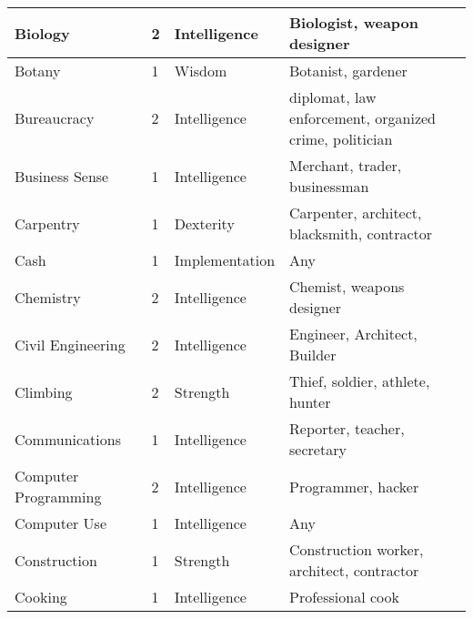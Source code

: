 \documentclass[twoside]{book}
\begin{document}
\begin{longtable}{p{1.25in}llp{12em}}
  \raggedright
           Biology 
  &
   2 
  &
   Intelligence 
  &
   Biologist, weapon
           designer 
  \tabularnewline
  \hline
      
  \raggedright
           Botany 
  &
   1 
  &
   Wisdom 
  &
   Botanist, gardener
           
  \tabularnewline
  \hline
      
  \raggedright
           Bureaucracy 
  &
   2 
  &
   Intelligence 
  &
   diplomat, law
           enforcement, organized crime, politician 
  \tabularnewline
  \hline
      
  \raggedright
           Business Sense 
  &
   1 
  &
   Intelligence 
  &
   Merchant, trader,
           businessman 
  \tabularnewline
  \hline
      
  \raggedright
           Carpentry 
  &
   1 
  &
   Dexterity 
  &
   Carpenter, architect,
           blacksmith, contractor 
  \tabularnewline
  \hline
      
  \raggedright
           Cash 
  &
   1 
  &
   Implementation 
  &
   Any 
  \tabularnewline
  \hline
      
  \raggedright
           Chemistry 
  &
   2 
  &
   Intelligence 
  &
   Chemist, weapons designer
           
  \tabularnewline
  \hline
      
  \raggedright
           Civil Engineering 
  &
   2 
  &
   Intelligence 
  &
   Engineer, Architect,
           Builder 
  \tabularnewline
  \hline
      
  \raggedright
           Climbing 
  &
   2 
  &
   Strength 
  &
   Thief, soldier, athlete,
           hunter 
  \tabularnewline
  \hline
      
  \raggedright
           Communications 
  &
   1 
  &
   Intelligence 
  &
   Reporter, teacher,
           secretary 
  \tabularnewline
  \hline
      
  \raggedright
           Computer Programming 
  &
   2 
  &
   Intelligence 
  &
   Programmer, hacker
           
  \tabularnewline
  \hline
      
  \raggedright
           Computer Use 
  &
   1 
  &
   Intelligence 
  &
   Any 
  \tabularnewline
  \hline
      
  \raggedright
           Construction 
  &
   1 
  &
   Strength 
  &
   Construction worker,
           architect, contractor 
  \tabularnewline
  \hline
      
  \raggedright
           Cooking 
  &
   1 
  &
   Intelligence 
  &
   Professional cook
           

\end{longtable}
\end{document}
